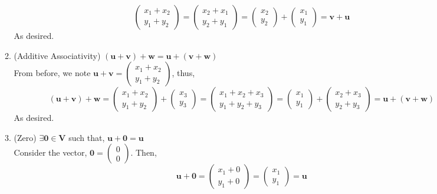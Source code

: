 \documentclass[letterpaper,10pt]{article}
\newcommand{\vect}[1]{\boldsymbol{#1}}
\begin{document}
\begin{description}
\begin{enumerate}
\begin{enumerate}
\[\begin{pmatrix}
x_1+x_2 \\
y_1+y_2
\end{pmatrix}=\begin{pmatrix}
x_2+x_1 \\
y_2+y_1
\end{pmatrix}=\begin{pmatrix}
x_2 \\
y_2
\end{pmatrix}+\begin{pmatrix}
x_1 \\
y_1
\end{pmatrix}=\vect{v}+\vect{u}\]
As desired.
\item (Additive Associativity) $(\vect{u}+\vect{v})+\vect{w}=\vect{u}+(\vect{v}+\vect{w})$\\
From before, we note $\vect{u}+\vect{v}=\begin{pmatrix}
x_1+x_2 \\
y_1+y_2
\end{pmatrix}$, thus,
\[(\vect{u}+\vect{v})+\vect{w}=\begin{pmatrix}
x_1+x_2 \\
y_1+y_2
\end{pmatrix}+\begin{pmatrix}
x_3 \\
y_3
\end{pmatrix}=\begin{pmatrix}
x_1+x_2+x_3 \\
y_1+y_2+y_3
\end{pmatrix}=\begin{pmatrix}
x_1 \\
y_1
\end{pmatrix}+\begin{pmatrix}
x_2+x_3 \\
y_2+y_3
\end{pmatrix}=\vect{u}+(\vect{v}+\vect{w})\]
As desired.
\item (Zero) $\exists\vect{0}\in\vect{V}$ such that, $\vect{u}+\vect{0}=\vect{u}$\\
Consider the vector, $\vect{0}=\begin{pmatrix}
0 \\
0
\end{pmatrix}$. Then,
\[\vect{u}+\vect{0}=\begin{pmatrix}
x_1+0 \\
y_1+0
\end{pmatrix}=\begin{pmatrix}
x_1 \\
y_1
\end{pmatrix}=\vect{u}\]

\end{enumerate}
\end{enumerate}
\end{description}
\end{document}
